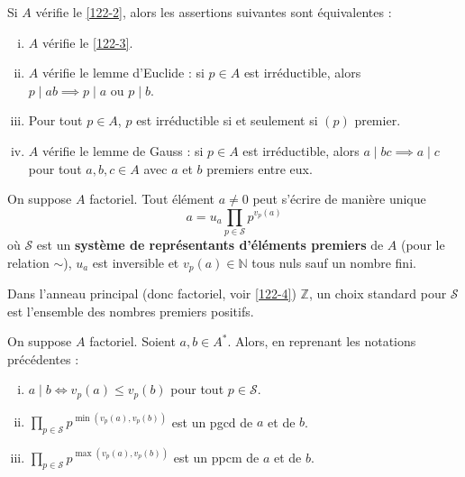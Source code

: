 	
	\begin{proposition}
		Si $A$ vérifie le \cref{122-2}, alors les assertions suivantes sont équivalentes :
		\begin{enumerate}[(i)]
			\item $A$ vérifie le \cref{122-3}.
			\item $A$ vérifie le lemme d'Euclide : si $p \in A$ est irréductible, alors $p \mid ab \implies p \mid a \text { ou } p \mid b$.
			\item Pour tout $p \in A$, $p$ est irréductible si et seulement si $(p)$ premier.
			\item $A$ vérifie le lemme de Gauss : si $p \in A$ est irréductible, alors $a \mid bc \implies a \mid c$ pour tout $a, b, c \in A$ avec $a$ et $b$ premiers entre eux.
		\end{enumerate}
	\end{proposition}
	
	
	\begin{proposition}
		On suppose $A$ factoriel. Tout élément $a \neq 0$ peut s'écrire de manière unique
		\[ a = u_a \prod_{p \in \mathcal{S}} p^{v_p(a)} \]
		où $\mathcal{S}$ est un \textbf{système de représentants d'éléments premiers} de $A$ (pour le relation $\sim$), $u_a$ est inversible et $v_p(a) \in \mathbb{N}$ tous nuls sauf un nombre fini.
	\end{proposition}
	
	\begin{example}
		Dans l'anneau principal (donc factoriel, voir \cref{122-4}) $\mathbb{Z}$, un choix standard pour $\mathcal{S}$ est l'ensemble des nombres premiers positifs.
	\end{example}
	
	\begin{proposition}
		On suppose $A$ factoriel. Soient $a, b \in A^*$. Alors, en reprenant les notations précédentes :
		\begin{enumerate}[(i)]
			\item $a \mid b \iff v_p(a) \leq v_p(b)$ pour tout $p \in \mathcal{S}$.
			\item $\prod_{p \in \mathcal{S}} p^{\min(v_p(a), v_p(b))}$ est un pgcd de $a$ et de $b$.
			\item $\prod_{p \in \mathcal{S}} p^{\max(v_p(a), v_p(b))}$ est un ppcm de $a$ et de $b$.
		\end{enumerate}
	\end{proposition}
	
